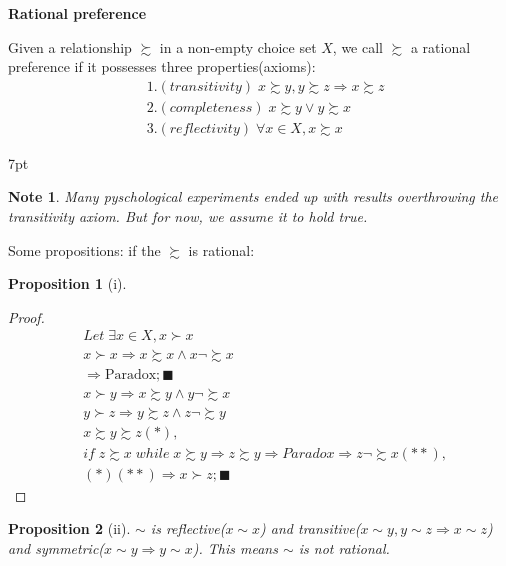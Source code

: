 \documentclass{article}
\newenvironment{blueblock}{
\def\FrameCommand{
  \hspace{1pt}
    {\color{DarkBlue}
    \vrule width 2pt}
    {\color{blueshade}
    \vrule width 4pt}
  \colorbox{blueshade}
}
\MakeFramed{
  \advance
  \hsize-
  \width
  \FrameRestore}
\noindent\hspace{-4.55pt}%
\begin{adjustwidth}{}{7pt}
\vspace{2pt}\vspace{2pt}
}
{\vspace{2pt}\end{adjustwidth}\endMakeFramed}
\newtheorem{note}{Note}
\newtheorem{proposition}{Proposition}
\begin{document}
\textbf{Rational preference}

Given a relationship $\succsim$ in a non-empty choice set $X$, we call $\succsim$ a rational preference if it possesses three properties(axioms):
\begin{align}
&1.(transitivity) \; x\succsim y,y\succsim z \Rightarrow x\succsim z
\\&2.(completeness) \; x\succsim y \lor y\succsim x
\\&3.(reflectivity) \;\forall x\in X, x\succsim x
\end{align}

\begin{blueblock}
\begin{note}
Many pyschological experiments ended up with results overthrowing the transitivity axiom. But for now, we assume it to hold true.
\end{note}
\end{blueblock}


Some propositions: if the $\succsim$ is rational:

\begin{proposition}[i]
\end{proposition}

\begin{proof}
\begin{align}
&Let \;\exists x \in X, x \succ x
\\&x \succ x \Rightarrow x\succsim x \land x \neg \succsim x
\\&\Rightarrow \text{Paradox}; \blacksquare
\\&x\succ y \Rightarrow x\succsim y \land y \neg \succsim x
\\&y\succ z \Rightarrow y\succsim z \land z \neg \succsim y
\\&x\succsim y \succsim z (*),
\\&if \;z \succsim x \;while\;x\succsim y\Rightarrow z \succsim y \Rightarrow Paradox \Rightarrow z \neg \succsim x(**),
\\&(*)(**)\Rightarrow x\succ z ;\blacksquare
\end{align}
\end{proof}

\begin{proposition}[ii]
$\sim$ is reflective($x\sim x$) and transitive($x\sim y, y\sim z \Rightarrow x\sim z$) and symmetric($x\sim y \Rightarrow y \sim x$). This means $\sim$ is not rational.
\end{proposition}
\end{document}
